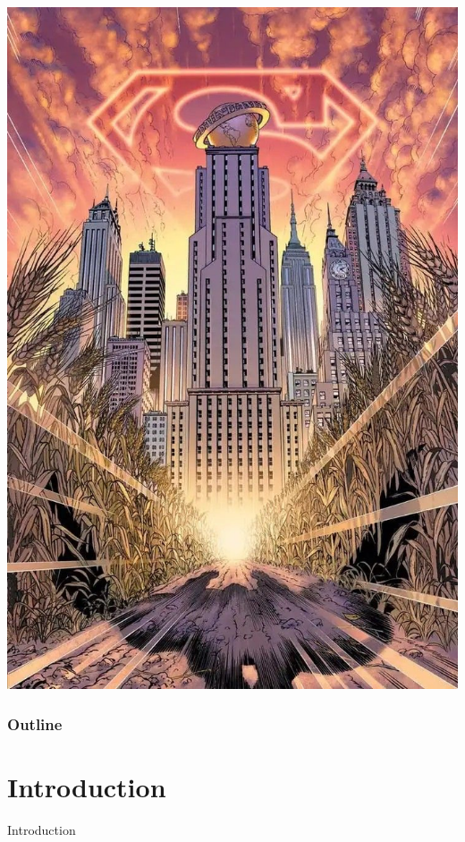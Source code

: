 \documentclass[usernames,dvipsnames]{beamer}
\begin{document}
\begin{frame}
		\includegraphics[scale = 0.17]{images/DailyPlanet}
	\endminipage\hfill
	
\end{frame}

\begin{frame}	
	\frametitle{Outline}
	\tableofcontents
\end{frame}


\section{Introduction}

\begin{frame}	
	\begin{Huge}
		\begin{center}
			Introduction
		\end{center}
	\end{Huge}
\end{frame}
\end{document}
